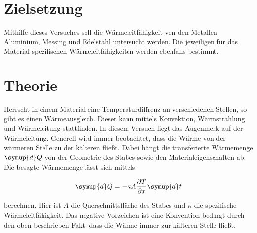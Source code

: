 \section{Zielsetzung}
Mithilfe dieses Versuches soll die Wärmeleitfähigkeit von den Metallen Aluminium, Messing und Edelstahl untersucht werden.
Die jeweiligen für das Material spezifischen Wärmeleitfähigkeiten werden ebenfalls bestimmt.


\section{Theorie}
\label{sec:Theorie}

Herrscht in einem Material eine Temperaturdiffrenz an verschiedenen Stellen, so gibt es einen Wärmeausgleich.
Dieser kann mittels Konvektion, Wärmstrahlung und Wärmeleitung stattfinden. In diesem Versuch liegt das Augenmerk auf der Wärmeleitung.
Generell wird immer beobachtet, dass die Wärme von der wärmeren Stelle zu der kälteren fließt.
Dabei hängt die transferierte Wärmemenge $\symup{d}Q$ von der Geometrie des Stabes sowie den Materialeigenschaften ab. Die besagte Wärmemenge lässt sich mittels

\begin{equation}
\label{eqn:waermemenge}
    \symup{d}Q = -\kappa A \frac{\partial T}{\partial x}\symup{d}t
\end{equation}

berechnen. Hier ist $A$ die Querschnittsfläche des Stabes und $\kappa$ die spezifische Wärmeleitfähigkeit. Das negative Vorzeichen ist eine Konvention bedingt durch den oben beschrieben Fakt, dass die Wärme immer zur kälteren Stelle fließt.

